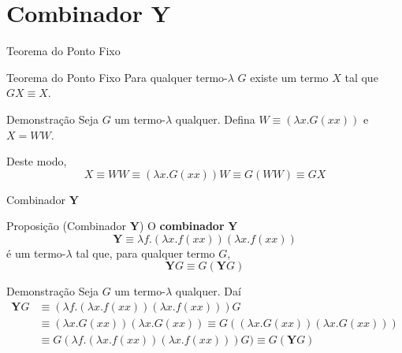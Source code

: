 \section{Combinador $\mathbf{Y}$}

\begin{frame}[fragile]{Teorema do Ponto Fixo}

    \begin{block}{Teorema do Ponto Fixo}
        Para qualquer termo-$\lambda$ $G$ existe um termo $X$ tal que $GX\equiv X$.
    \end{block}

    \vspace{0.2in}

    \begin{block}{Demonstração}
        Seja $G$ um termo-$\lambda$ qualquer. Defina $W\equiv (\lambda x.G(xx))$ e $X=WW$. 

        Deste modo,
        \[
            X\equiv WW \equiv (\lambda x.G(xx))W \equiv G(WW)\equiv GX
        \]
    \end{block}
\end{frame}

\begin{frame}[fragile]{Combinador $\mathbf{Y}$}

    \begin{block}{Proposição (Combinador $\mathbf{Y}$)}
    O \textbf{combinador} $\mathbf{Y}$
    \[
        \mathbf{Y}\equiv \lambda f.(\lambda x.f(xx))(\lambda x.f(xx))
    \]
    é um termo-$\lambda$ tal que, para qualquer termo $G$,
    \[
        \mathbf{Y}G\equiv G(\mathbf{Y}G)
    \]
    \end{block}

    \vspace{0.1in}

    \begin{block}{Demonstração}
        Seja $G$ um termo-$\lambda$ qualquer. Daí
        \begin{align*}
            \mathbf{Y}G &\equiv (\lambda f.(\lambda x.f(xx))(\lambda x.f(xx)))G \\
             &\equiv (\lambda x.G(xx))(\lambda x.G(xx)) \equiv G((\lambda x.G(xx))(\lambda x.G(xx))) \\
             &\equiv G(\lambda f.(\lambda x.f(xx))(\lambda x.f(xx)))G) \equiv G(\mathbf{Y}G)
        \end{align*}
    \end{block}
\end{frame}

